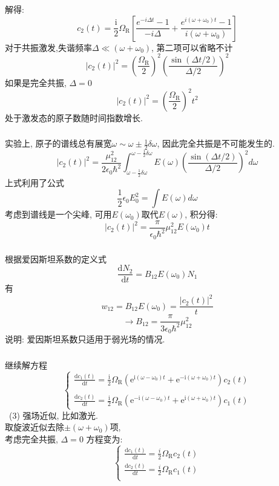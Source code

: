 \begin{frame} 
\frametitle{}
解得:
\[ c_2(t)=\frac{\mathrm{i}}{2} \Omega_{\mathrm{R}}\left[ \frac{ e^{-i \Delta t}-1}{-i \Delta  } + \frac{ e^{i (\omega + \omega_0) t}-1}{i (\omega + \omega_0) }\right] \]
对于共振激发,失谐频率$\Delta \ll (\omega + \omega_0)$, 第二项可以省略不计\\
\[ \left|c_2(t) \right|^2 = (\frac{\Omega_{\mathrm{R}}}{2})^2 (\frac{\sin (\Delta t /2)}{\Delta /2})^2\]
如果是完全共振, $\Delta =0$  
\[ \left|c_2(t) \right|^2 = (\frac{\Omega_{\mathrm{R}}}{2})^2 t^2\]  
处于激发态的原子数随时间指数增长. 
\end{frame}

\begin{frame} 
\frametitle{}
实验上, 原子的谱线总有展宽$\omega\sim \omega \pm \frac{1}{2} \delta \omega$, 因此完全共振是不可能发生的.
\[ \left|c_2(t) \right|^2 = \frac{\mu_{12} ^2}{2\epsilon_0 \hbar^2} \int _{\omega - \frac{1}{2}  \delta \omega} ^ {\omega - \frac{1}{2}  \delta \omega} E(\omega)(\frac{\sin (\Delta t /2)}{\Delta /2})^2 d \omega\]
上式利用了公式
\[ \frac{1}{2} \epsilon_0 E^2_0 =\int E(\omega) d \omega\] 
考虑到谱线是一个尖峰, 可用$E(\omega_0)$取代$E(\omega)$, 积分得:
\[ \left|c_2(t) \right|^2 = \frac{\pi}{\epsilon_0 \hbar^2}\mu_{12} ^2 E(\omega_0) t \]  
\end{frame}

\begin{frame} 
\frametitle{}
    根据爱因斯坦系数的定义式
    \[ \frac{\mathrm{d}N_2}{\mathrm{d}t} = B_{12}E(\omega_0) N_1\]
    有
    \[ w_{12} = B_{12}E(\omega_0) = \frac{\left|c_2(t) \right|^2 }{t}\]
    \[ \to B_{12} = \frac{\pi}{3 \epsilon_0 \hbar^2} \mu_{12} ^2 \]
    说明: 爱因斯坦系数只适用于弱光场的情况.  
\end{frame}

\begin{frame} 
    \frametitle{}
    {\Bullet} 继续解方程
    \[ \begin{cases}
        \frac{\mathrm{d}c_1(t)}{\mathrm{d}t}=\frac{\mathrm{i}}{2} \Omega_{\mathrm{R}}\left(\mathrm{e}^{\mathrm{i}\left(\omega-\omega_{0}\right) t}+\mathrm{e}^{-\mathrm{i}\left(\omega+\omega_{0}\right) t}\right) c_{2}(t) \\ 
        ~\\
        \frac{\mathrm{d}c_2(t)}{\mathrm{d}t}=\frac{\mathrm{i}}{2} \Omega_{\mathrm{R}}\left(\mathrm{e}^{-\mathrm{i}\left(\omega-\omega_{0}\right) t}+\mathrm{e}^{\mathrm{i}\left(\omega+\omega_{0}\right) t}\right) c_{1}(t)
     \end{cases} \]
        \解 ~(3) 强场近似, 比如激光. \\ 
        取旋波近似去除$\pm(\omega + \omega_0)$项, \\
        考虑完全共振, $\Delta =0$  方程变为:
        \[ \begin{cases}
            \frac{\mathrm{d}c_1(t)}{\mathrm{d}t}=\frac{i}{2} \Omega_{\mathrm{R}} c_2(t)\\ 
            \frac{\mathrm{d}c_2(t)}{\mathrm{d}t}=\frac{i}{2} \Omega_{\mathrm{R}} c_1(t)\\
         \end{cases} \]
    \end{frame}

